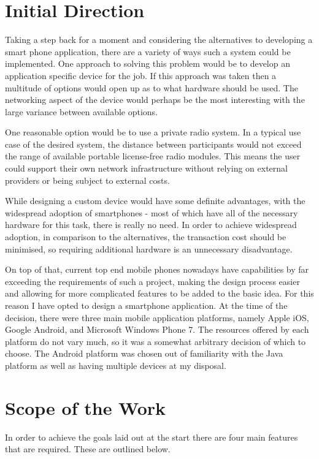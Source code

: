 \section{Initial Direction}

Taking a step back for a moment and considering the alternatives to developing a smart phone application, there are a variety of ways such a system could be implemented. One approach to solving this problem would be to develop an application specific device for the job. If this approach was taken then a multitude of options would open up as to what hardware should be used.
The networking aspect of the device would perhaps be the most interesting with the large variance between available options.

One reasonable option would be to use a private radio system. In a typical use case of the desired system, the distance between participants would not exceed the range of available portable license-free radio modules. This means the user could support their own network infrastructure without relying on external providers or being subject to external costs.

While designing a custom device would have some definite advantages, with the widespread adoption of smartphones - most of which have all of the necessary hardware for this task, there is really no need. In order to achieve widespread adoption, in comparison to the alternatives, the transaction cost should be minimised, so requiring additional hardware is an unnecessary disadvantage.

On top of that, current top end mobile phones nowadays have capabilities by far exceeding the requirements of such a project, making the design process easier and allowing for more complicated features to be added to the basic idea.
For this reason I have opted to design a smartphone application. At the time of the decision, there were three main mobile application platforms, namely Apple iOS, Google Android, and Microsoft Windows Phone 7. The resources offered by each platform do not vary much, so it was a somewhat arbitrary decision of which to choose. The Android platform was chosen out of familiarity with the Java platform as well as having multiple devices at my disposal.

\section{Scope of the Work}

In order to achieve the goals laid out at the start there are four main features that are required. These are outlined below.

